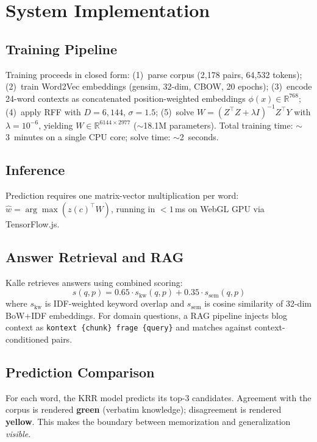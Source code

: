 \documentclass[11pt,a4paper]{article}
\begin{document}
\section{System Implementation}

\subsection{Training Pipeline}

Training proceeds in closed form: (1)~parse corpus (2,178 pairs, 64,532 tokens); (2)~train Word2Vec embeddings (gensim, 32-dim, CBOW, 20 epochs); (3)~encode 24-word contexts as concatenated position-weighted embeddings $\phi(x) \in \mathbb{R}^{768}$; (4)~apply RFF with $D=6{,}144$, $\sigma=1.5$; (5)~solve $W = (Z^\top Z + \lambda I)^{-1} Z^\top Y$ with $\lambda = 10^{-6}$, yielding $W \in \mathbb{R}^{6144 \times 2977}$ ($\sim$18.1M parameters). Total training time: $\sim$3~minutes on a single CPU core; solve time: $\sim$2~seconds.

\subsection{Inference}

Prediction requires one matrix-vector multiplication per word: $\hat{w} = \arg\max(z(c)^\top W)$, running in ${<}1$\,ms on WebGL GPU via TensorFlow.js.

\subsection{Answer Retrieval and RAG}

Kalle retrieves answers using combined scoring:
\begin{equation}
  s(q, p) = 0.65 \cdot s_{\mathrm{kw}}(q, p) + 0.35 \cdot s_{\mathrm{sem}}(q, p)
\end{equation}
where $s_{\mathrm{kw}}$ is IDF-weighted keyword overlap and $s_{\mathrm{sem}}$ is cosine similarity of 32-dim BoW+IDF embeddings. For domain questions, a RAG pipeline injects blog context as \texttt{kontext \{chunk\} frage \{query\}} and matches against context-conditioned pairs.

\subsection{Prediction Comparison}

For each word, the KRR model predicts its top-3 candidates. Agreement with the corpus is rendered \textbf{green} (verbatim knowledge); disagreement is rendered \textbf{yellow}. This makes the boundary between memorization and generalization \emph{visible}.
\end{document}
